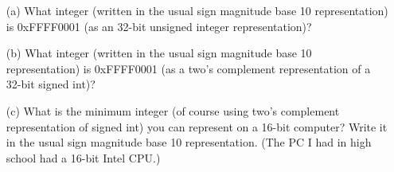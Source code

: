\mbox{}
\begin{enumerate}

\item[(a)] What integer (written in the usual sign magnitude
  base 10 representation) is 0xFFFF0001
  (as an 32-bit unsigned integer representation)?

\item[(b)] What integer (written in the
  usual sign magnitude base 10 representation) is 0xFFFF0001
  (as a two’s complement representation of a 32-bit signed int)?

\item[(c)]
  What is the minimum integer (of course using two's complement
  representation of signed int)
  you can represent on a 16-bit computer?
  Write it in the usual sign magnitude base 10 representation. 
  (The PC I had in high school had a 16-bit Intel CPU.)
\end{enumerate}
